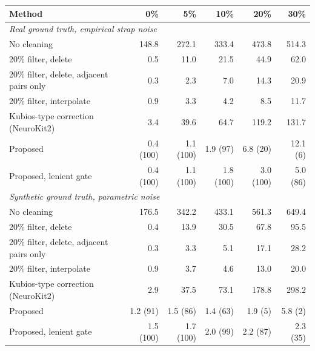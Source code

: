 \begin{tabular}{lrrrrr}
\toprule
Method & 0\% & 5\% & 10\% & 20\% & 30\% \\
\midrule
\multicolumn{6}{l}{\textit{Real ground truth, empirical strap noise}} \\
No cleaning & 148.8 & 272.1 & 333.4 & 473.8 & 514.3 \\
20\% filter, delete & 0.5 & 11.0 & 21.5 & 44.9 & 62.0 \\
20\% filter, delete, adjacent pairs only & 0.3 & 2.3 & 7.0 & 14.3 & 20.9 \\
20\% filter, interpolate & 0.9 & 3.3 & 4.2 & 8.5 & 11.7 \\
Kubios-type correction (NeuroKit2) & 3.4 & 39.6 & 64.7 & 119.2 & 131.7 \\
Proposed & 0.4 \textcolor{inksoft}{(100)} & 1.1 \textcolor{inksoft}{(100)} & 1.9 \textcolor{inksoft}{(97)} & 6.8 \textcolor{inksoft}{(20)} & 12.1 \textcolor{inksoft}{(6)} \\
Proposed, lenient gate & 0.4 \textcolor{inksoft}{(100)} & 1.1 \textcolor{inksoft}{(100)} & 1.8 \textcolor{inksoft}{(100)} & 3.0 \textcolor{inksoft}{(100)} & 5.0 \textcolor{inksoft}{(86)} \\
\midrule
\multicolumn{6}{l}{\textit{Synthetic ground truth, parametric noise}} \\
No cleaning & 176.5 & 342.2 & 433.1 & 561.3 & 649.4 \\
20\% filter, delete & 0.4 & 13.9 & 30.5 & 67.8 & 95.5 \\
20\% filter, delete, adjacent pairs only & 0.3 & 3.3 & 5.1 & 17.1 & 28.2 \\
20\% filter, interpolate & 0.9 & 3.7 & 4.6 & 13.0 & 20.0 \\
Kubios-type correction (NeuroKit2) & 2.9 & 37.5 & 73.1 & 178.8 & 298.2 \\
Proposed & 1.2 \textcolor{inksoft}{(91)} & 1.5 \textcolor{inksoft}{(86)} & 1.4 \textcolor{inksoft}{(63)} & 1.9 \textcolor{inksoft}{(5)} & 5.8 \textcolor{inksoft}{(2)} \\
Proposed, lenient gate & 1.5 \textcolor{inksoft}{(100)} & 1.7 \textcolor{inksoft}{(100)} & 2.0 \textcolor{inksoft}{(99)} & 2.2 \textcolor{inksoft}{(87)} & 2.3 \textcolor{inksoft}{(35)} \\
\bottomrule
\end{tabular}
